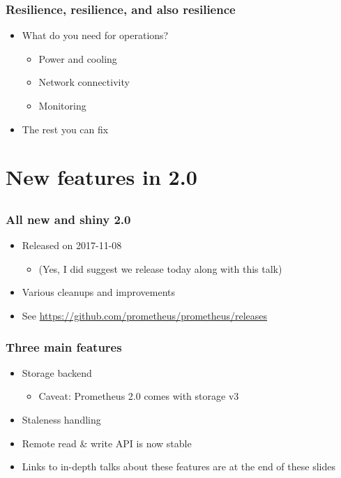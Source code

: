 \documentclass[t]{beamer}
\begin{document}
\begin{frame}
	\frametitle{Resilience, resilience, and also resilience}
	\begin{itemize}
		\item What do you need for operations?
		\begin{itemize}
			\item Power and cooling
			\item Network connectivity
			\item Monitoring
		\end{itemize}
		\item The rest you can fix
	\end{itemize}
\end{frame}


\section{New features in 2.0}
\subsection{}

\begin{frame}
	\frametitle{All new and shiny 2.0}
	\begin{itemize}
		\item Released on 2017-11-08
		\begin{itemize}
			\item (Yes, I did suggest we release today along with this talk)
		\end{itemize}
		\item Various cleanups and improvements
		\item See \url{https://github.com/prometheus/prometheus/releases}
	\end{itemize}
\end{frame}

\begin{frame}
	\frametitle{Three main features}
	\begin{itemize}
		\item Storage backend
		\begin{itemize}
			\item Caveat: Prometheus 2.0 comes with storage v3
		\end{itemize}
		\item Staleness handling
		\item Remote read \& write API is now stable
		\item Links to in-depth talks about these features are at the end of these slides
	\end{itemize}
\end{frame}
\end{document}
